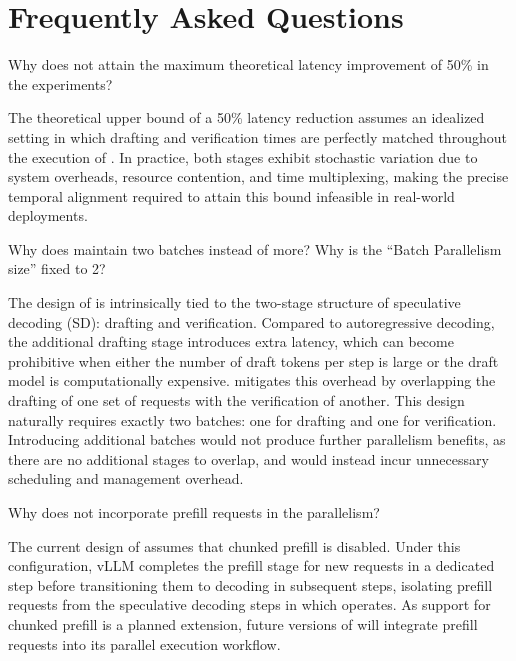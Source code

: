 

\section{Frequently Asked Questions}
\label{asec:faq}


 Why does \alg{} not attain the maximum theoretical latency improvement of 50\% in the experiments?

The theoretical upper bound of a 50\% latency reduction assumes an idealized setting in which drafting and verification times are perfectly matched throughout the execution of \alg{}. In practice, both stages exhibit stochastic variation due to system overheads, resource contention, and time multiplexing, making the precise temporal alignment required to attain this bound infeasible in real-world deployments.


 Why does \alg{} maintain two batches instead of more? Why is the ``Batch Parallelism size'' fixed to 2?

The design of \alg{} is intrinsically tied to the two-stage structure of speculative decoding (SD): drafting and verification. Compared to autoregressive decoding, the additional drafting stage introduces extra latency, which can become prohibitive when either the number of draft tokens per step is large or the draft model is computationally expensive. \alg{} mitigates this overhead by overlapping the drafting of one set of requests with the verification of another. This design naturally requires exactly two batches: one for drafting and one for verification. Introducing additional batches would not produce further parallelism benefits, as there are no additional stages to overlap, and would instead incur unnecessary scheduling and management overhead.


 Why does \alg{} not incorporate prefill requests in the parallelism?

The current design of \alg{} assumes that chunked prefill is disabled. Under this configuration, vLLM completes the prefill stage for new requests in a dedicated step before transitioning them to decoding in subsequent steps, isolating prefill requests from the speculative decoding steps in which \alg{} operates. As support for chunked prefill is a planned extension, future versions of \alg{} will integrate prefill requests into its parallel execution workflow. \\